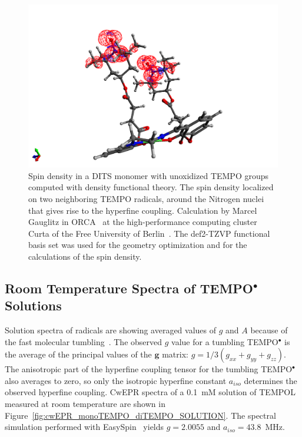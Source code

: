 \begin{figure}[h]
\center
	\includegraphics[width=1\textwidth]{./operando_epr/figures/DITS_DFT.pdf}
	\caption{Spin density in a DITS monomer with unoxidized TEMPO groups computed with density functional theory. The spin density localized on two neighboring TEMPO radicals, around the Nitrogen nuclei that gives rise to the hyperfine coupling. Calculation by Marcel Gauglitz in ORCA~\cite{ORCA} at the high-performance computing cluster Curta of the Free University of Berlin~\cite{Curta}. The def2-TZVP functional basis set was used for the geometry optimization and for the calculations of the spin density.}
	\label{fig:TEMPO_dft}
\end{figure}



\subsection{Room Temperature Spectra of TEMPO$^{\bullet}$ Solutions}
Solution spectra of radicals are showing averaged values of $g$ and $A$ because of the fast molecular tumbling~\cite{Liu_2008,Carrington_solution_epr}. The observed $g$ value for a tumbling TEMPO$^{\bullet}$ is the average of the principal values of the $\textbf{g}$ matrix: $g = 1/3\left(g_{xx}+g_{yy}+g_{zz}\right)$. The anisotropic part of the hyperfine coupling tensor for the tumbling TEMPO$^{\bullet}$ also averages to zero, so only the isotropic hyperfine constant $a_{iso}$ determines the observed hyperfine coupling. CwEPR spectra of a 0.1~mM solution of TEMPOL measured at room temperature are shown in Figure~\ref{fig:cwEPR_monoTEMPO_diTEMPO_SOLUTION}. The spectral simulation performed with EasySpin~\cite{Stoll2006} yields $g=2.0055$ and $a_{iso}=43.8$~MHz.


